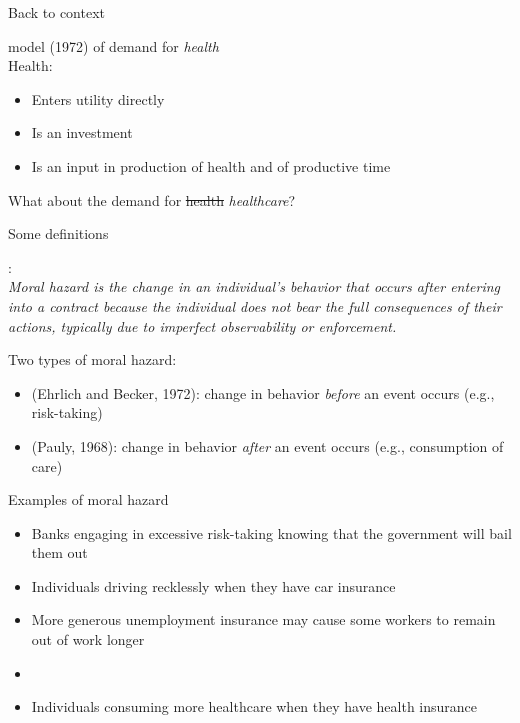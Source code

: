 \begin{frame}{Back to context}

     model (1972) of demand for \textit{health}\\
    Health:
    \begin{itemize}
        \item Enters utility directly
        \item Is an investment
        \item Is an input in production of health and of productive time
    \end{itemize}
    \vspace{3mm}

    What about the demand for \sout{health} \textit{healthcare}?
    
\end{frame}
\begin{frame}{Some definitions}

    :\\
    \textit{Moral hazard is the change in an individual's behavior
    that occurs after entering into a contract because the individual
    does not bear the full consequences of their actions,
    typically due to imperfect observability or enforcement.}
    \vspace{5mm}

    \pause
    Two types of moral hazard:
    \begin{itemize}
        \item {} {\color{gray} \small (Ehrlich and Becker, 1972)}: change in behavior \textit{before} an event occurs (e.g., risk-taking)
        \item {} {\color{gray} \small (Pauly, 1968)}: change in behavior \textit{after} an event occurs (e.g., consumption of care)
    \end{itemize}

\end{frame}
\begin{frame}{Examples of moral hazard}

    \begin{itemize}
        \item Banks engaging in excessive risk-taking knowing that the government will bail them out
        \item Individuals driving recklessly when they have car insurance
        \item More generous unemployment insurance may cause some workers to remain out of work longer
        \item {} 
        \item Individuals consuming more healthcare when they have health insurance
    \end{itemize}
    
\end{frame}
